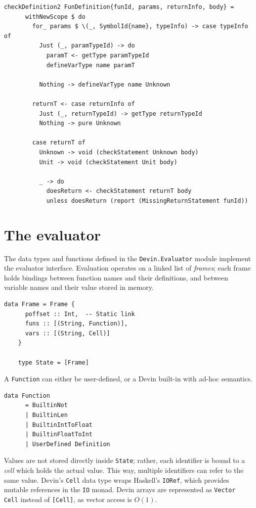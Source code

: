 \documentclass[UdineBachThesis,american,11pt]{PhdThesis}
\begin{document}
  \begin{Verbatim}[gobble=4,fontsize=\small]
    checkDefinition2 FunDefinition{funId, params, returnInfo, body} =
      withNewScope $ do
        for_ params $ \(_, SymbolId{name}, typeInfo) -> case typeInfo of
          Just (_, paramTypeId) -> do
            paramT <- getType paramTypeId
            defineVarType name paramT

          Nothing -> defineVarType name Unknown

        returnT <- case returnInfo of
          Just (_, returnTypeId) -> getType returnTypeId
          Nothing -> pure Unknown

        case returnT of
          Unknown -> void (checkStatement Unknown body)
          Unit -> void (checkStatement Unit body)

          _ -> do
            doesReturn <- checkStatement returnT body
            unless doesReturn (report (MissingReturnStatement funId))
  \end{Verbatim}

  \section{The evaluator}

  The data types and functions defined in the \mbox{\texttt{Devin.Evaluator}}
  module implement the evaluator interface. Evaluation operates on a linked list
  of \emph{frames}; each frame holds bindings between function names and their
  definitions, and between variable names and their value stored in memory.

  \begin{Verbatim}[gobble=4,fontsize=\small]
    data Frame = Frame {
      poffset :: Int,  -- Static link
      funs :: [(String, Function)],
      vars :: [(String, Cell)]
    }

    type State = [Frame]
  \end{Verbatim}

  A \mbox{\texttt{Function}} can either be user-defined, or a Devin built-in
  with ad-hoc semantics.

  \begin{Verbatim}[gobble=4,fontsize=\small]
    data Function
      = BuiltinNot
      | BuiltinLen
      | BuiltinIntToFloat
      | BuiltinFloatToInt
      | UserDefined Definition
  \end{Verbatim}

  Values are not stored directly inside \mbox{\texttt{State}}; rather, each
  identifier is bound to a \emph{cell} which holds the actual value. This way,
  multiple identifiers can refer to the same value. Devin's \mbox{\texttt{Cell}}
  data type wraps Haskell's \mbox{\texttt{IORef}}, which provides mutable
  references in the \mbox{\texttt{IO}} monad. Devin arrays are represented as
  \mbox{\texttt{Vector Cell}} instead of \mbox{\texttt{[Cell]}}, as vector
  access is \mbox{$O\mathopen{}\left(1\right)\mathclose{}$}.
\end{document}

